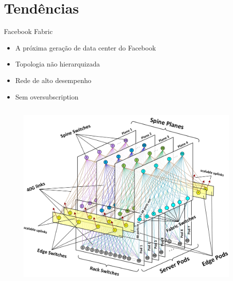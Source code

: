 \documentclass[aspectratio=169]{beamer}
\begin{document}
\section{Tendências}
    \begin{frame} {Facebook Fabric}
        
        
        
	  \begin{itemize}
		                        
		            \item
		                  A próxima geração de data center do Facebook
		     
		        
		             \item
		               Topologia não hierarquizada
		                
		               \item
		                 Rede de alto desempenho
		               \item
		               		Sem oversubscription
		               		                   
		     
		                
		     \end{itemize}
	        
   
              \begin{columns}    
              \begin{figure}[ht]    
                  \includegraphics[scale=0.3]{scheme_fabric.jpg}
                    

\end{figure}
\end{columns}
\end{frame}
\end{document}
